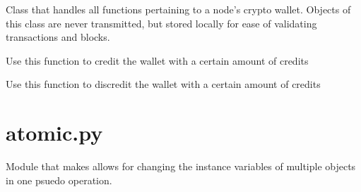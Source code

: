 \documentclass[letterpaper,10pt,english]{sphinxmanual}
\begin{document}

\begin{fulllineitems}
\label{\detokenize{index:wallet.Wallet}}
Class that handles all functions pertaining to a node’s crypto
wallet.  Objects of this class are never transmitted, but stored
locally for ease of validating transactions and blocks.

\begin{fulllineitems}
\label{\detokenize{index:wallet.Wallet.credit_amount}}
Use this function to credit the wallet with a certain amount of
credits

\end{fulllineitems}


\begin{fulllineitems}
\label{\detokenize{index:wallet.Wallet.discredit_amount}}
Use this function to discredit the wallet with a certain amount of
credits

\end{fulllineitems}


\end{fulllineitems}

\label{\detokenize{index:module-atomic}}

\section{atomic.py}
\label{\detokenize{index:atomic-py}}
Module that makes allows for changing the instance variables of multiple objects in one psuedo  operation.
\end{document}
